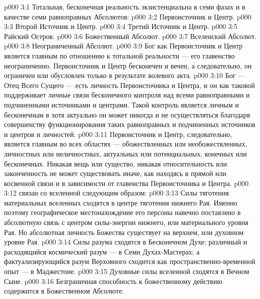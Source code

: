 \vs p000 3:1 Тотальная, бесконечная реальность экзистенциальна в семи фазах и в качестве семи равноправных Абсолютов:
\vs p000 3:2 \bibnobreakspace Первоисточник и Центр.
\vs p000 3:3 \bibnobreakspace Второй Источник и Центр.
\vs p000 3:4 \bibnobreakspace Третий Источник и Центр.
\vs p000 3:5 \bibnobreakspace Райский Остров.
\vs p000 3:6 \bibnobreakspace Божественный Абсолют.
\vs p000 3:7 \bibnobreakspace Вселенский Абсолют.
\vs p000 3:8 \bibnobreakspace Неограниченный Абсолют.
\vs p000 3:9 \pc Бог как Первоисточник и Центр является главным по отношению к тотальной реальности --- его главенство неограниченно. Первоисточник и Центр бесконечен и вечен, а следовательно, он ограничен или обусловлен только в результате волевого акта.
\vs p000 3:10 Бог --- Отец Всего Сущего --- есть личность Первоисточника и Центра, и он как таковой поддерживает личные связи бесконечного контроля над всеми равноправными и подчиненными источниками и центрами. Такой контроль является личным и бесконечным в  хотя актуально он может никогда и не осуществляться благодаря совершенству функционирования таких равноправных и подчиненных источников и центров и личностей.
\vs p000 3:11 Первоисточник и Центр, следовательно, является главным во всех областях --- обожествленных или необожествленных, личностных или неличностных, актуальных или потенциальных, конечных или бесконечных. Никакая вещь или существо, никакая относительность или законченность не может существовать иначе, как находясь в прямой или косвенной связи и в зависимости от главенства Первоисточника и Центра.
\vs p000 3:12 \pc {} связан со вселенной следующим образом:
\vs p000 3:13 \bibnobreakspace Силы тяготения материальных вселенных сходятся в центре тяготения нижнего Рая. Именно поэтому географическое местонахождение его персоны навечно поставлено в абсолютную связь с центром силы\hyp{}энергии нижнего, или материального уровня Рая. Но абсолютная личность Божества существует на верхнем, или духовном уровне Рая.
\vs p000 3:14 \bibnobreakspace Силы разума сходятся в Бесконечном Духе; различный и расходящийся космический разум --- в Семи Духах\hyp{}Мастерах; а фактуализирующийся разум Верховного сходится как пространственно\hyp{}временной опыт --- в Маджестоне.
\vs p000 3:15 \bibnobreakspace Духовные силы вселенной сходятся в Вечном Сыне.
\vs p000 3:16 \bibnobreakspace Безграничная способность к божественному действию содержится в Божественном Абсолюте.

